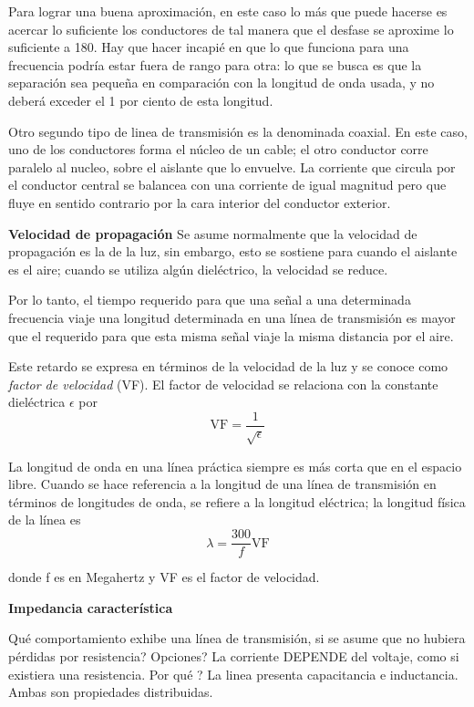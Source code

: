 \documentclass[12pt,letterpaper,titlepage,twoside]{book}
\begin{document}
Para lograr una buena aproximación, en este caso lo más que puede hacerse es acercar lo suficiente los conductores de tal manera que el desfase se aproxime lo suficiente a 180. Hay que hacer incapié en que lo que funciona para una frecuencia podría estar fuera de rango para otra: lo que se busca es que la separación sea pequeña en comparación con la longitud de onda usada, y no deberá exceder el 1 por ciento de esta longitud.

Otro segundo tipo de linea de transmisión es la denominada coaxial. En este caso, uno de los conductores forma el núcleo de un cable; el otro conductor corre paralelo al nucleo, sobre el aislante que lo envuelve. La corriente que circula por el conductor central se balancea con una corriente de igual magnitud pero que fluye en sentido contrario por la cara interior del conductor exterior.



\textbf{Velocidad de propagación }
Se asume normalmente que la velocidad de propagación es la de la luz, sin embargo, esto se sostiene para cuando el aislante es el aire; cuando se utiliza algún dieléctrico, la velocidad se reduce.

Por lo tanto, el tiempo requerido para que una señal a una determinada frecuencia viaje una longitud determinada en una línea de transmisión es mayor que el requerido para que esta misma señal viaje la misma distancia por el aire.

Este retardo se expresa en términos de la velocidad de la luz y se conoce como \emph{factor de velocidad} (VF). El factor de velocidad se relaciona con la constante dieléctrica $\epsilon$ por
\begin{equation}
 \text{VF} = \frac{1}{\sqrt{\epsilon}}
 \end{equation} 


La longitud de onda en una línea práctica siempre es más corta que en el espacio libre. Cuando se hace referencia a la longitud de una línea de transmisión en términos de longitudes de onda, se refiere a la longitud eléctrica; la longitud física de la línea es
\begin{equation}
\lambda = \frac{300}{f}\text{VF}
\end{equation}

donde f es en Megahertz y VF es el factor de velocidad.

\textbf{Impedancia característica}

Qué comportamiento exhibe una línea de transmisión, si se asume que no hubiera pérdidas por resistencia? Opciones?  La corriente DEPENDE del voltaje, como si existiera una resistencia. Por qué ?  La linea presenta capacitancia e inductancia. Ambas son propiedades distribuidas.
\end{document}
